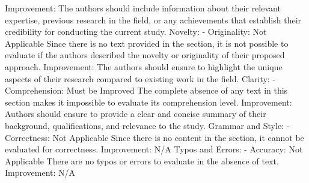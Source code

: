 \documentclass{article}%
\begin{document}
\newline%
Improvement:\newline%
The authors should include information about their relevant expertise, previous research in the field, or any achievements that establish their credibility for conducting the current study.\newline%
\newline%
Novelty:\newline%
{-} Originality: Not Applicable\newline%
Since there is no text provided in the section, it is not possible to evaluate if the authors described the novelty or originality of their proposed approach.\newline%
\newline%
Improvement:\newline%
The authors should ensure to highlight the unique aspects of their research compared to existing work in the field.\newline%
\newline%
Clarity:\newline%
{-} Comprehension: Must be Improved\newline%
The complete absence of any text in this section makes it impossible to evaluate its comprehension level.\newline%
\newline%
Improvement:\newline%
Authors should ensure to provide a clear and concise summary of their background, qualifications, and relevance to the study.\newline%
\newline%
Grammar and Style:\newline%
{-} Correctness: Not Applicable\newline%
Since there is no content in the section, it cannot be evaluated for correctness.\newline%
\newline%
Improvement:\newline%
N/A\newline%
\newline%
Typos and Errors:\newline%
{-} Accuracy: Not Applicable\newline%
There are no typos or errors to evaluate in the absence of text.\newline%
\newline%
Improvement:\newline%
N/A

%
\end{document}
